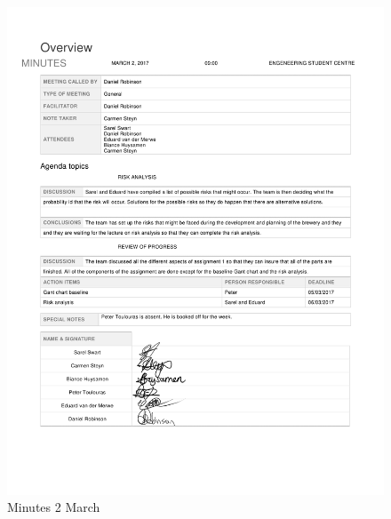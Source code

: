 \begin{appendices}
\begin{figure}[H]
\centering
\includegraphics[scale=0.25]{Meeting_minutes_02_March.png}
\caption{Minutes 2 March}
\end{figure}

\end{appendices}




